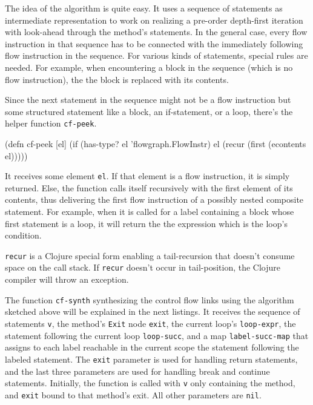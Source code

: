 \documentclass[11pt]{article}
\begin{document}
The idea of the algorithm is quite easy.  It uses a sequence of statements as
intermediate representation to work on realizing a pre-order depth-first
iteration with look-ahead through the method's statements.  In the general
case, every flow instruction in that sequence has to be connected with the
immediately following flow instruction in the sequence.  For various kinds of
statements, special rules are needed.  For example, when encountering a block
in the sequence (which is no flow instruction), the the block is replaced with
its contents.

Since the next statement in the sequence might not be a flow instruction but
some structured statement like a block, an if-statement, or a loop, there's the
helper function \verb|cf-peek|.

\begin{clojurecode}
(defn cf-peek [el]
  (if (has-type? el 'flowgraph.FlowInstr)
    el
    (recur (first (econtents el)))))
\end{clojurecode}

It receives some element \verb|el|.  If that element is a flow instruction, it
is simply returned.  Else, the function calls itself recursively with the first
element of its contents, thus delivering the first flow instruction of a
possibly nested composite statement.  For example, when it is called for a
label containing a block whose first statement is a loop, it will return the
the expression which is the loop's condition.

\verb|recur| is a Clojure special form enabling a tail-recursion that doesn't
consume space on the call stack.  If \verb|recur| doesn't occur in
tail-position, the Clojure compiler will throw an exception.

The function \verb|cf-synth| synthesizing the control flow links using the
algorithm sketched above will be explained in the next listings.  It receives
the sequence of statements \verb|v|, the method's \verb|Exit| node \verb|exit|,
the current loop's \verb|loop-expr|, the statement following the current loop
\verb|loop-succ|, and a map \verb|label-succ-map| that assigns to each label
reachable in the current scope the statement following the labeled statement.
The \verb|exit| parameter is used for handling return statements, and the last
three parameters are used for handling break and continue statements.
Initially, the function is called with \verb|v| only containing the method, and
\verb|exit| bound to that method's exit.  All other parameters are \verb|nil|.
\end{document}
